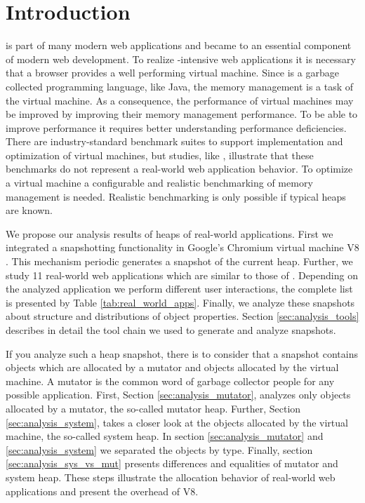 
\section{Introduction}

\JS is part of many modern web applications and became to an essential
component of modern web development. To realize \JS-intensive web applications
it is necessary that a browser provides a well performing \JS virtual machine.
Since \JS is a garbage collected programming language, like Java, the memory
management is a task of the virtual machine. As a consequence, the performance
of \JS virtual machines may be improved by improving their memory management
performance. To be able to improve performance it requires better understanding
performance deficiencies. There are industry-standard benchmark suites to
support implementation and optimization of \JS virtual machines, but studies,
like \cite{JSMeter2009}, illustrate that these benchmarks do not represent a
real-world web application behavior. To optimize a \JS virtual machine a
configurable and realistic benchmarking of memory management is needed.
Realistic benchmarking is only possible if typical \JS heaps are known.

We propose our analysis results of \JS heaps of real-world applications. First
we integrated a snapshotting functionality in Google's Chromium \cite{Chromium}
virtual machine V8 \cite{V8}. This mechanism periodic generates a snapshot of
the current \JS heap. Further, we study 11 real-world web applications which
are similar to those of \cite{JSMeter2009}. Depending on the analyzed
application we perform different user interactions, the complete list is
presented by Table \ref{tab:real_world_apps}. Finally, we analyze these
snapshots about structure and distributions of object properties. Section
\ref{sec:analysis_tools} describes in detail the tool chain we used to generate
and analyze snapshots.

If you analyze such a heap snapshot, there is to consider that a snapshot
contains objects which are allocated by a mutator and objects allocated by the
\JS virtual machine. A mutator is the common word of garbage collector people
for any possible application. First, Section \ref{sec:analysis_mutator},
analyzes only objects allocated by a mutator, the so-called mutator heap.
Further, Section \ref{sec:analysis_system}, takes a closer look at the objects
allocated by the virtual machine, the so-called system heap. In section
\ref{sec:analysis_mutator} and \ref{sec:analysis_system} we separated the
objects by type. Finally, section \ref{sec:analysis_sys_vs_mut} presents
differences and equalities of mutator and system heap. These steps illustrate
the allocation behavior of real-world web applications and present the overhead
of V8.


